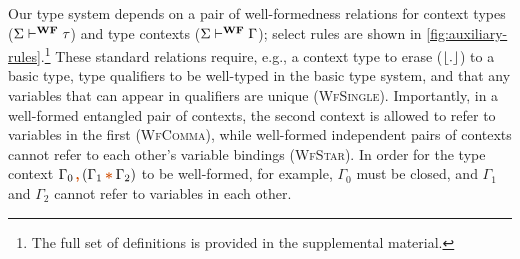 Our type system depends on a pair of well-formedness relations for
context types ($\Sigma \vdash^{\textbf{WF}} \tau$) and type contexts
($\Sigma \vdash^{\textbf{WF}} \Gamma$); select rules are shown in
\autoref{fig:auxiliary-rules}.\footnote{The full set of definitions
  is provided in the supplemental material.}  These standard
relations require, e.g., a context type to erase ($\lfloor {.} \rfloor$) to a
basic type, type qualifiers to be well-typed in the basic type system,
and that any variables that can appear in qualifiers are unique
(\textsc{WfSingle}).  Importantly, in a well-formed entangled pair of
contexts, the second context is allowed to refer to variables in the
first (\textsc{WfComma}), while well-formed independent pairs of
contexts cannot refer to each other's variable bindings
(\textsc{WfStar}). In order for the type context
$\Gamma_0 \ctcomma (\Gamma_1 \ctstar \Gamma_2)$ to be well-formed, for
example, $\Gamma_0$ must be closed, and $\Gamma_1$ and $\Gamma_2$
cannot refer to variables in each other.

